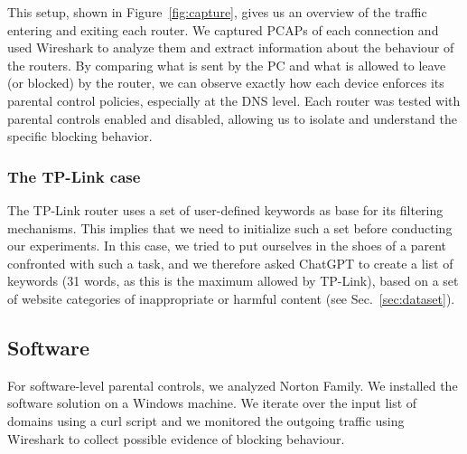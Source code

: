 This setup, shown in Figure~\ref{fig:capture}, gives us an overview of the traffic entering and exiting each router. 
We captured PCAPs of each connection and used Wireshark to analyze them and extract information about the behaviour of the routers.
By comparing what is sent by the PC and what is allowed to leave (or blocked) by the router, we can observe exactly how each device enforces its parental control policies, especially at the DNS level.
Each router was tested with parental controls enabled and disabled, allowing us to isolate and understand the specific blocking behavior.

\subsubsection{The TP-Link case}
The TP-Link router uses a set of user-defined keywords as base for its filtering mechanisms. This implies that we need to initialize such a set before conducting our experiments. In this case, we tried to put ourselves in the shoes of a parent confronted with such a task, and we therefore asked ChatGPT to create a list of keywords (31 words, as this is the maximum allowed by TP-Link), based on a set of website categories of inappropriate or harmful content (see Sec.~\ref{sec:dataset}).

\subsection{Software}
For software-level parental controls, we analyzed Norton Family. 
We installed the software solution on a Windows machine. We iterate over the input list of domains using a curl script and we monitored the outgoing traffic using Wireshark to collect possible evidence of blocking behaviour.  

